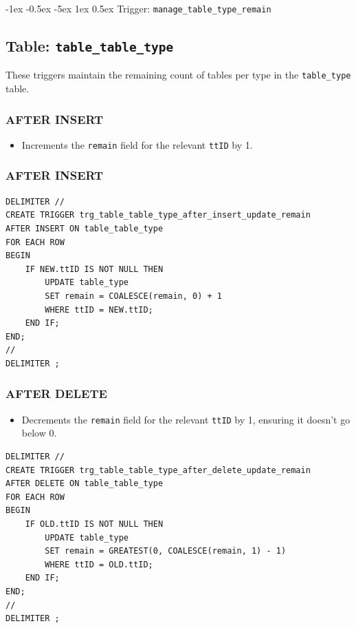 \documentclass[12pt]{article}
\makeatletter
\renewcommand\section{\@startsection{section}{1}{\z@}%
    {-1ex \@plus -0.5ex \@minus -5ex} %
    {1ex \@plus 0.5ex} %
    {\normalfont\Large\bfseries}} %
\makeatother
\begin{document}
\section{Trigger: \texttt{manage\_table\_type\_remain}}

\subsection*{Table: \texttt{table\_table\_type}}
These triggers maintain the remaining count of tables per type in the \texttt{table\_type} table.

\subsubsection*{AFTER INSERT}
\begin{itemize}
    \item Increments the \texttt{remain} field for the relevant \texttt{ttID} by 1.
\end{itemize}

\subsubsection*{AFTER INSERT}
\begin{lstlisting}
DELIMITER //
CREATE TRIGGER trg_table_table_type_after_insert_update_remain
AFTER INSERT ON table_table_type
FOR EACH ROW
BEGIN
    IF NEW.ttID IS NOT NULL THEN
        UPDATE table_type
        SET remain = COALESCE(remain, 0) + 1
        WHERE ttID = NEW.ttID;
    END IF;
END;
//
DELIMITER ;
\end{lstlisting}

\subsubsection*{AFTER DELETE}
\begin{itemize}
    \item Decrements the \texttt{remain} field for the relevant \texttt{ttID} by 1, ensuring it doesn't go below 0.
\end{itemize}
\begin{lstlisting}
DELIMITER //
CREATE TRIGGER trg_table_table_type_after_delete_update_remain
AFTER DELETE ON table_table_type
FOR EACH ROW
BEGIN
    IF OLD.ttID IS NOT NULL THEN
        UPDATE table_type
        SET remain = GREATEST(0, COALESCE(remain, 1) - 1)
        WHERE ttID = OLD.ttID;
    END IF;
END;
//
DELIMITER ;
\end{lstlisting}
\end{document}
